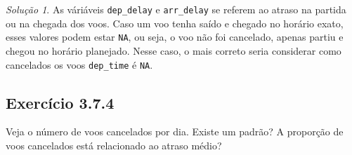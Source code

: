 \documentclass[
]{latex/krantz}
\theoremstyle{definition}
\theoremstyle{definition}
\theoremstyle{definition}
\theoremstyle{definition}
\theoremstyle{remark}
\newtheorem*{solution}{Solução}
\begin{document}
\begin{solution}
As váriáveis \texttt{dep\_delay} e \texttt{arr\_delay} se referem ao atraso na partida ou na chegada dos voos. Caso um voo tenha saído e chegado no horário exato, esses valores podem estar \texttt{NA}, ou seja, o voo não foi cancelado, apenas partiu e chegou no horário planejado. Nesse caso, o mais correto seria considerar como cancelados os voos \texttt{dep\_time} é \texttt{NA}.
\end{solution}

\hypertarget{exr3-7-4}{%
\subsection*{Exercício 3.7.4}\label{exr3-7-4}}

Veja o número de voos cancelados por dia. Existe um padrão? A proporção de voos cancelados está relacionado ao atraso médio?
\end{document}
